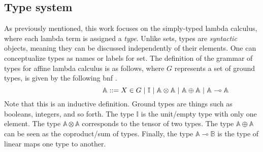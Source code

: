 \subsection{Type system}

As previously mentioned, this work focuses on the simply-typed lambda calculus, where each lambda term is assigned a \emph{type}. Unlike sets, types are \emph{syntactic} objects, meaning they can be discussed independently of their elements. One can conceptualize types as names or labels for set. The definition of the grammar of types for affine lambda calculus is as follows, where $G$ represents a set of ground types, is given by the following \acrfull{bnf} \cite{backus1960report}.
\begin{equation} \label{eq:grammartypes}
\centering
\hspace{95pt} \mathbb{A} ::= X \in G \hspace{3 pt} \vert \hspace{3 pt} \mathbb{I}  \hspace{3 pt}  \vert \hspace{3 pt} \mathbb{A}  \otimes  \mathbb{A} \hspace{3 pt}  \vert \hspace{3 pt} \mathbb{A}  \oplus  \mathbb{A} \hspace{3 pt} \vert  \hspace{3 pt}  \mathbb{A} \multimap  \mathbb{A}
\end{equation}
Note that this is an inductive definition. Ground types are things such as booleans, integers, and so forth. The type $\mathbb{I}$ is the unit/empty type with only one element. The type $\mathbb{A} \otimes \mathbb{A}$ corresponds to the tensor of two types. The type $\mathbb{A} \oplus \mathbb{A}$ can be seen as the coproduct/sum of types. Finally, the type $\mathbb{A} \multimap \mathbb{B}$ is the type of linear maps one type to another.




